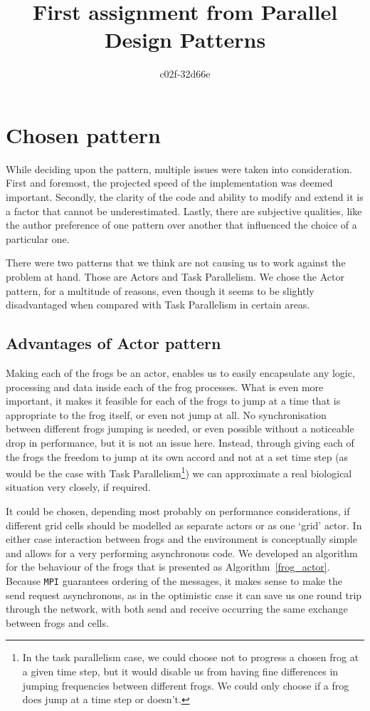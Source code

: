 \documentclass[11pt,a4paper]{article}
\begin{document}
\title{First assignment from Parallel Design Patterns}
\author{c02f-32d66e}
\maketitle

\section{Chosen pattern}
While deciding upon the pattern, multiple issues were taken into consideration.
First and foremost, the projected speed of the implementation was deemed important.
Secondly, the clarity of the code and ability to modify and extend it is a factor that cannot be underestimated.
Lastly, there are subjective qualities, like the author preference of one pattern over another that influenced the choice of a particular one.

There were two patterns that we think are not causing us to work against the problem at hand.
Those are Actors and Task Parallelism. 
We chose the Actor pattern, for a multitude of reasons, even though it seems to be slightly disadvantaged when compared with Task Parallelism in certain areas.

\subsection{Advantages of Actor pattern}
Making each of the frogs be an actor, enables us to easily encapsulate any logic, processing and data inside each of the frog processes.
What is even more important, it makes it feasible for each of the frogs to jump at a time that is appropriate to the frog itself, or even not jump at all.
No synchronisation between different frogs jumping is needed, or even possible without a noticeable drop in performance, but it is not an issue here.
Instead, through giving each of the frogs the freedom to jump at its own accord and not at a set time step (as would be the case with Task Parallelism\footnote{In the task parallelism case, we could choose not to progress a chosen frog at a given time step, but it would disable us from having fine differences in jumping frequencies between different frogs. We could only choose if a frog does jump at a time step or doesn't.}) we can approximate a real biological situation very closely, if required.

It could be chosen, depending most probably on performance considerations, if different grid cells should be modelled as separate actors or as one `grid' actor.
In either case interaction between frogs and the environment is conceptually simple and allows for a very performing asynchronous code.
We developed an algorithm for the behaviour of the frogs that is presented as Algorithm~\ref{frog_actor}. 
Because \texttt{MPI} guarantees ordering of the messages, it makes sense to make the send request asynchronous, as in the optimistic case it can save us one round trip through the network, with both send and receive occurring the same exchange between frogs and cells.
\end{document}
